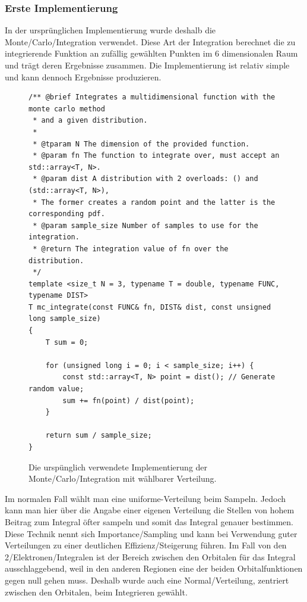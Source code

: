 \subsubsection{Erste Implementierung}
In der ursprünglichen Implementierung wurde deshalb die Monte\-/Carlo\-/Integration verwendet.
Diese Art der Integration berechnet die zu integrierende Funktion an zufällig gewählten Punkten
im 6 dimensionalen Raum und trägt deren Ergebnisse zusammen. Die Implementierung ist relativ simple
und kann dennoch Ergebnisse produzieren.
\begin{figure}[H]
\begin{verbatim}
/** @brief Integrates a multidimensional function with the monte carlo method
 * and a given distribution.
 *
 * @tparam N The dimension of the provided function.
 * @param fn The function to integrate over, must accept an std::array<T, N>.
 * @param dist A distribution with 2 overloads: () and (std::array<T, N>),
 * The former creates a random point and the latter is the corresponding pdf.
 * @param sample_size Number of samples to use for the integration.
 * @return The integration value of fn over the distribution.
 */
template <size_t N = 3, typename T = double, typename FUNC, typename DIST>
T mc_integrate(const FUNC& fn, DIST& dist, const unsigned long sample_size)
{
    T sum = 0;
 
    for (unsigned long i = 0; i < sample_size; i++) {
        const std::array<T, N> point = dist(); // Generate random value;
        sum += fn(point) / dist(point);
    }

    return sum / sample_size;
}
\end{verbatim}
\caption{Die urspünglich verwendete Implementierung der Monte\-/Carlo\-/Integration mit wählbarer Verteilung.}
\end{figure}

Im normalen Fall wählt man eine uniforme-Verteilung beim Sampeln. Jedoch kann man hier
über die Angabe einer eigenen Verteilung die Stellen von hohem Beitrag
zum Integral öfter sampeln und somit das Integral genauer bestimmen.
Diese Technik nennt sich Importance\-/Sampling
und kann bei Verwendung guter Verteilungen zu einer deutlichen Effizienz\-/Steigerung führen.
Im Fall von den 2\-/Elektronen\-/Integralen ist der Bereich
zwischen den Orbitalen für das Integral ausschlaggebend,
weil in den anderen Regionen eine der beiden Orbitalfunktionen gegen null gehen muss.
Deshalb wurde auch eine Normal\-/Verteilung, zentriert zwischen den Orbitalen,
beim Integrieren gewählt.

